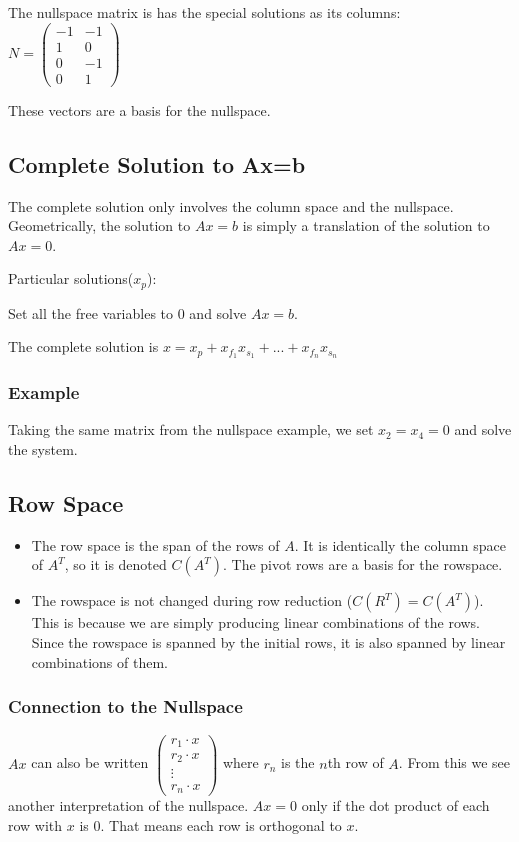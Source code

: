 \documentclass[12pt]{article}
\DeclareMathOperator \dotprod{\cdot}
\begin{document}
\begin{itemize}
The nullspace matrix is has the special solutions as its columns:
$N = \begin{pmatrix}
-1&-1\\
1&0\\
0&-1\\
0&1 
\end{pmatrix}$

These vectors are a basis for the nullspace.


\subsection{Complete Solution to Ax=b}
The complete solution only involves the column space and the nullspace. Geometrically, the solution to $Ax=b$ is simply a translation of the solution to $Ax=0$.

Particular solutions($x_p$): 

Set all the free variables to 0 and solve $Ax=b$.

The complete solution is $ x = x_p + x_{f_1} x_{s_1} + ... + x_{f_n} x_{s_n}$

\subsubsection{Example}
Taking the same matrix from the nullspace example, we set $x_2 = x_4 = 0$ and solve the system.

\subsection{Row Space}
\begin{itemize}
\item The row space is the span of the rows of $A$. It is identically the column space of $A^T$, so it is denoted $C(A^T)$.  The pivot rows are a basis for the rowspace. 

\item The rowspace is not changed during row reduction ($C(R^T) = C(A^T)$). This is because we are simply producing linear combinations of the rows.  Since the rowspace is spanned by the initial rows, it is also spanned by linear combinations of them.


\end{itemize}
\subsubsection{Connection to the Nullspace}
$Ax$ can also be written $\begin{pmatrix} r_1 \dotprod x \\ r_2 \dotprod x \\ \vdots \\ r_n \dotprod x \end{pmatrix}$ where $r_n$ is the $n$th row of $A$. From this we see another interpretation of the nullspace.  $Ax = 0$ only if the dot product of each row with $x$ is $0$.  That means each row is orthogonal to $x$.



\end{itemize}
\end{document}

